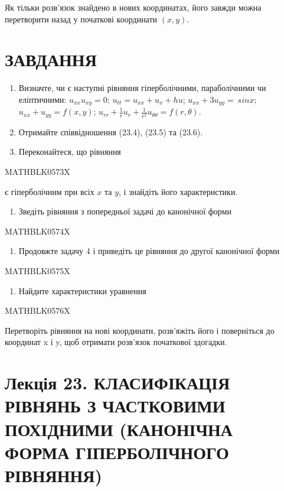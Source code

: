 \documentclass[
  ukrainian,
]{article}
\providecommand{\tightlist}{%
  \setlength{\itemsep}{0pt}\setlength{\parskip}{0pt}}
\begin{document}
Як тільки розв'язок знайдено в нових координатах, його завжди можна
перетворити назад у початкові координати \((x,y)\).

\section{ЗАВДАННЯ}\label{ux437ux430ux432ux434ux430ux43dux43dux44f-16}

\begin{enumerate}
\def\labelenumi{\arabic{enumi}.}
\item
  Визначте, чи є наступні рівняння гіперболічними, параболічними чи
  еліптичними: \(u_{xx}u_{xy}=0\); \(u_{tt}=u_{xx}+u_x+hu\);
  \(u_{xx}+3u_{yy}=\ sin x\); \(u_{xx}+u_{yy}=f(x,y)\);
  \(u_{rr}+\frac{1}{r}u_r+\frac{1}{r^2}u_{\theta\theta}=f(r,\theta)\).
\item
  Отримайте співвідношення (23.4), (23.5) та (23.6).
\item
  Переконайтеся, що рівняння
\end{enumerate}

MATHBLK0573X

є гіперболічним при всіх \(x\) та \(y\), і знайдіть його характеристики.

\begin{enumerate}
\def\labelenumi{\arabic{enumi}.}
\setcounter{enumi}{3}
\tightlist
\item
  Зведіть рівняння з попередньої задачі до канонічної форми
\end{enumerate}

MATHBLK0574X

\begin{enumerate}
\def\labelenumi{\arabic{enumi}.}
\setcounter{enumi}{4}
\tightlist
\item
  Продовжте задачу 4 і приведіть це рівняння до другої канонічної форми
\end{enumerate}

MATHBLK0575X

\begin{enumerate}
\def\labelenumi{\arabic{enumi}.}
\setcounter{enumi}{5}
\tightlist
\item
  Найдите характеристики уравнения
\end{enumerate}

MATHBLK0576X

Перетворіть рівняння на нові координати, розв'яжіть його і поверніться
до координат x і y, щоб отримати розв'язок початкової здогадки.

\section{Лекція 23. КЛАСИФІКАЦІЯ РІВНЯНЬ З ЧАСТКОВИМИ ПОХІДНИМИ
(КАНОНІЧНА ФОРМА ГІПЕРБОЛІЧНОГО
РІВНЯННЯ)}\label{ux43bux435ux43aux446ux456ux44f-23.-ux43aux43bux430ux441ux438ux444ux456ux43aux430ux446ux456ux44f-ux440ux456ux432ux43dux44fux43dux44c-ux437-ux447ux430ux441ux442ux43aux43eux432ux438ux43cux438-ux43fux43eux445ux456ux434ux43dux438ux43cux438-ux43aux430ux43dux43eux43dux456ux447ux43dux430-ux444ux43eux440ux43cux430-ux433ux456ux43fux435ux440ux431ux43eux43bux456ux447ux43dux43eux433ux43e-ux440ux456ux432ux43dux44fux43dux43dux44f}
\end{document}
